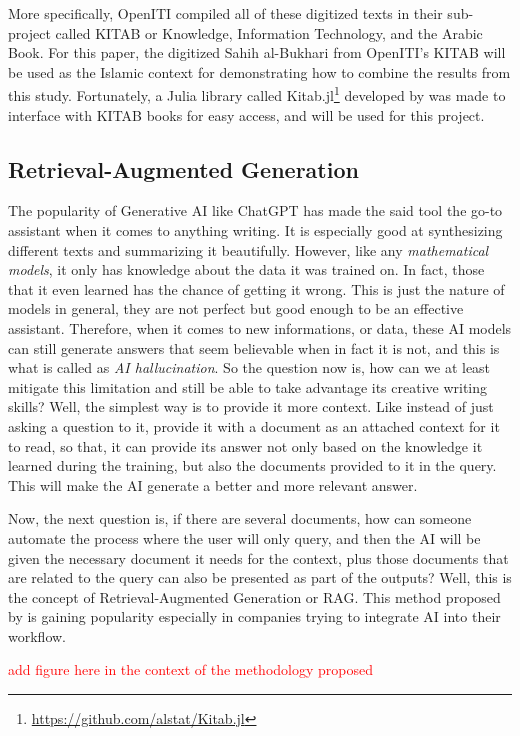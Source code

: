 More specifically, OpenITI compiled all of these digitized texts in their sub-project called KITAB or Knowledge, Information Technology, and the Arabic Book. For this paper, the digitized Sahih al-Bukhari from  OpenITI's KITAB will be used as the Islamic context for demonstrating how to combine the results from this study. Fortunately, a Julia library called Kitab.jl\footnote{\url{https://github.com/alstat/Kitab.jl}} developed by  was made to interface with KITAB books for easy access, and will be used for this project.
\subsection{Retrieval-Augmented Generation}
The popularity of Generative AI like ChatGPT has made the said tool the go-to assistant when it comes to anything writing. It is especially good at synthesizing different texts and summarizing it beautifully. However, like any \textit{mathematical models}, it only has knowledge about the data it was trained on. In fact, those that it even learned has the chance of getting it wrong. This is just the nature of models in general, they are not perfect but good enough to be an effective assistant. Therefore, when it comes to new informations, or data, these AI models can still generate answers that seem believable when in fact it is not, and this is what is called as \textit{AI hallucination}. So the question now is, how can we at least mitigate this limitation and still be able to take advantage its creative writing skills? Well, the simplest way is to provide it more context. Like instead of just asking a question to it, provide it with a document as an attached context for it to read, so that, it can provide its answer not only based on the knowledge it learned during the training, but also the documents provided to it in the query. This will make the AI generate a better and more relevant answer.

Now, the next question is, if there are several documents, how can someone automate the process where the user will only query, and then the AI will be given the necessary document it needs for the context, plus those documents that are related to the query can also be presented as part of the outputs? Well, this is the concept of Retrieval-Augmented Generation or RAG. This method proposed by  is gaining popularity especially in companies trying to integrate AI into their workflow.
\begin{center}
    \textcolor{red}{add figure here in the context of the methodology proposed}
\end{center}
